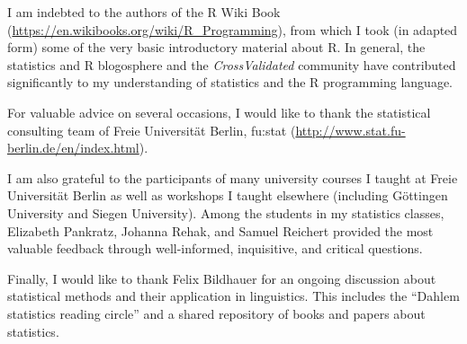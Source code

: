 
I am indebted to the authors of the R Wiki Book (\url{https://en.wikibooks.org/wiki/R_Programming}), from which I took (in adapted form) some of the very basic introductory material about R.
In general, the statistics and R blogosphere and the \textit{CrossValidated} community have contributed significantly to my understanding of statistics and the R programming language.

For valuable advice on several occasions, I would like to thank the statistical consulting team of Freie Universität Berlin, fu:stat (\url{http://www.stat.fu-berlin.de/en/index.html}).

I am also grateful to the participants of many university courses I taught at Freie Universität Berlin as well as workshops I taught elsewhere (including Göttingen University and Siegen University).
Among the students in my statistics classes, Elizabeth Pankratz, Johanna Rehak, and Samuel Reichert provided the most valuable feedback through well-informed, inquisitive, and critical questions.

Finally, I would like to thank Felix Bildhauer for an ongoing discussion about statistical methods and their application in linguistics.
This includes the ``Dahlem statistics reading circle'' and a shared repository of books and papers about statistics.


